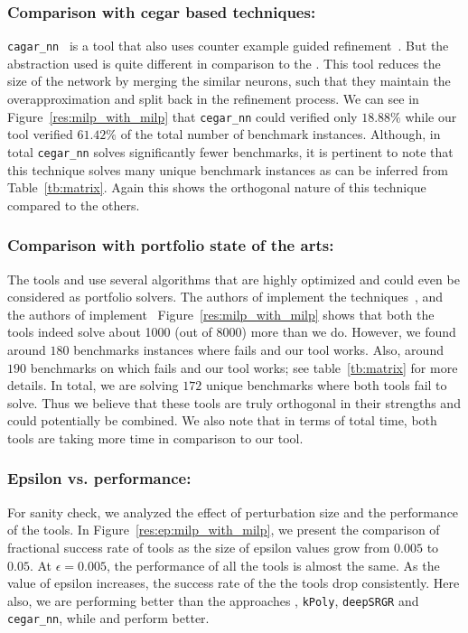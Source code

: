 \subsubsection{Comparison with cegar based techniques: }
\texttt{cagar\_nn}~\cite{elboher2020abstraction} is a tool that also uses  counter example guided refinement~. But the abstraction used is quite different in comparison to the  \deeppoly{}. This tool reduces the size of the network by merging the similar neurons, such that they maintain the overapproximation and split back in the refinement process. We can see in Figure~\ref{res:milp_with_milp} that \texttt{cegar\_nn} could verified only  $18.88\%$ while our tool verified $61.42\%$ of the total number of benchmark instances. Although, in total \texttt{cegar\_nn} solves significantly fewer benchmarks, it is pertinent to note that this technique solves many unique benchmark instances as can be inferred from Table~\ref{tb:matrix}. Again this shows the orthogonal nature of this technique compared to the others.%


\subsubsection{Comparison with portfolio state of the arts: }
The tools \alphabeta{} and \ovaltool{} use several algorithms that are highly optimized and could even be considered as portfolio solvers. The authors of \alphabeta{} implement the techniques~\cite{alphabetapapers}, and the authors of \ovaltool{} implement~\cite{ovalpapers}
Figure~\ref{res:milp_with_milp} shows that both the tools indeed solve about 1000 (out of 8000) more than we do. However, we found around $180$ benchmarks instances where \alphabeta{} fails and our tool works. Also, around $190$ benchmarks on which \ovaltool{} fails and our tool works; see table~\ref{tb:matrix} for more details. In total, we are solving $172$ unique benchmarks where both tools fail to solve. Thus we believe that these tools are truly orthogonal in their strengths and could potentially be combined. We also note that in terms of total time, both tools are taking more time in comparison to our tool. 



\subsubsection{Epsilon vs. performance: }
For sanity check, we analyzed the effect of perturbation size and the performance of the tools.
In Figure~\ref{res:ep:milp_with_milp}, we present the comparison of fractional success rate of tools as the size of epsilon values grow from $0.005$ to $0.05$. 
At $\epsilon=0.005$, the performance of all the tools is almost the same. As the value of epsilon increases, the success rate of the the tools drop consistently.
Here also, we are performing better than the approaches \deeppoly{}, 
\texttt{kPoly}, \texttt{deepSRGR} and \texttt{cegar\_nn}, while \alphabeta{} and \ovaltool{} perform better.

